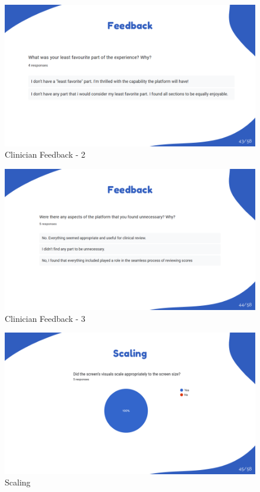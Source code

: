 \documentclass{article}
\begin{document}
\begin{figure}[H]
  \centering
  \includegraphics[width=\textwidth]{images/slide43.png}
  \caption{Clinician Feedback - 2}
  \label{fig:feedback_2}
\end{figure}

\begin{figure}[H]
  \centering
  \includegraphics[width=\textwidth]{images/slide44.png}
  \caption{Clinician Feedback - 3}
  \label{fig:feedback_3}
\end{figure}

\begin{figure}[H]
  \centering
  \includegraphics[width=\textwidth]{images/slide45.png}
  \caption{Scaling}
  \label{fig:feedback_4}
\end{figure}
\end{document}
